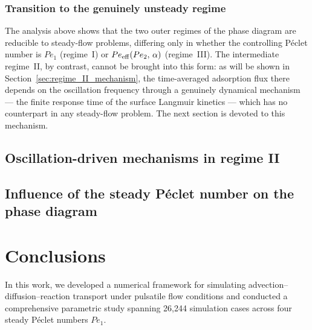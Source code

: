 \documentclass[lineno]{JFM-FLM_Au}
\begin{document}
\subsubsection{Transition to the genuinely unsteady regime}
\label{sec:transition_to_regimeII}
 
The analysis above shows that the two outer regimes of the phase
diagram are reducible to steady-flow problems, differing only in
whether the controlling P\'{e}clet number is $Pe_{1}$ (regime~I) or
$Pe_{\rm eff}(Pe_{2},\,\alpha)$ (regime~III). The intermediate
regime~II, by contrast, cannot be brought into this form: as will be
shown in Section~\ref{sec:regime_II_mechanism}, the time-averaged
adsorption flux there depends on the oscillation frequency through a
genuinely dynamical mechanism --- the finite response time of the
surface Langmuir kinetics --- which has no counterpart in any
steady-flow problem. The next section is devoted to this mechanism.

\subsection{Oscillation-driven mechanisms in regime II}

\subsection{Influence of the steady Péclet number on the phase diagram}

\section{Conclusions}
\label{sec:5}

In this work, we developed a numerical framework for simulating advection--diffusion--reaction transport under pulsatile flow conditions and conducted a comprehensive parametric study spanning 26,244 simulation cases across four steady P\'{e}clet numbers $Pe_1$.
\end{document}
